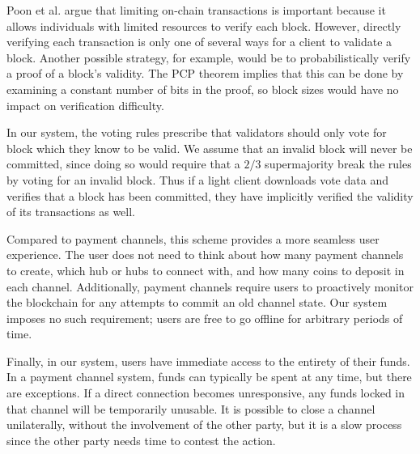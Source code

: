 Poon et al. argue that limiting on-chain transactions is important because it allows individuals with limited resources to verify each block. However, directly verifying each transaction is only one of several ways for a client to validate a block. Another possible strategy, for example, would be to probabilistically verify a proof of a block's validity. The PCP theorem \cite{arora1998proof} implies that this can be done by examining a constant number of bits in the proof, so block sizes would have no impact on verification difficulty.

In our system, the voting rules prescribe that validators should only vote for block which they know to be valid. We assume that an invalid block will never be committed, since doing so would require that a $2/3$ supermajority break the rules by voting for an invalid block. Thus if a light client downloads vote data and verifies that a block has been committed, they have implicitly verified the validity of its transactions as well.

Compared to payment channels, this scheme provides a more seamless user experience. The user does not need to think about how many payment channels to create, which hub or hubs to connect with, and how many coins to deposit in each channel. Additionally, payment channels require users to proactively monitor the blockchain for any attempts to commit an old channel state. Our system imposes no such requirement; users are free to go offline for arbitrary periods of time.

Finally, in our system, users have immediate access to the entirety of their funds. In a payment channel system, funds can typically be spent at any time, but there are exceptions. If a direct connection becomes unresponsive, any funds locked in that channel will be temporarily unusable. It is possible to close a channel unilaterally, without the involvement of the other party, but it is a slow process since the other party needs time to contest the action.
